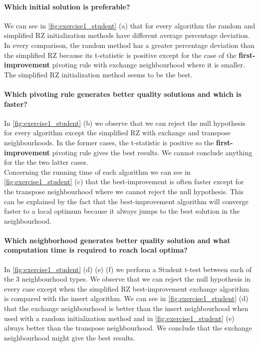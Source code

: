 \documentclass[a4paper,10pt]{article}
\begin{document}
\paragraph{Which initial solution is preferable?}

We can see in \ref{fig:exercise1_student} (a) that for every algorithm the random and simplified RZ initialization methods have different average percentage deviation. In every comparison, the random method has a greater percentage deviation than the simplified RZ because its t-statistic is positive except for the case of the \textbf{first-improvement} pivoting rule with exchange neighbourhood where it is smaller. The simplified RZ initialization method seems to be the best.

\paragraph{Which pivoting rule generates better quality solutions and which is faster?}

In \ref{fig:exercise1_student} (b) we observe that we can reject the null hypothesis for every algorithm except the simplified RZ with exchange and transpose neighbourhoods. In the former cases, the t-statistic is positive so the \textbf{first-improvement} pivoting rule gives the best results. We cannot conclude anything for the the two latter cases. \\

Concerning the running time of each algorithm we can see in \ref{fig:exercise1_student} (c) that the best-improvement is often faster except for the transpose neighbourhood where we cannot reject the null hypothesis. This can be explained by the fact that the best-improvement algorithm will converge faster to a local optimum because it always jumps to the best solution in the neighbourhood.

\paragraph{Which neighborhood generates better quality solution and what computation time is required to reach local optima?}

In \ref{fig:exercise1_student} (d) (e) (f) we perform a Student t-test between each of the 3 neighbourhood types. We observe that we can reject the null hypothesis in every case except when the simplified RZ best-improvement exchange algorithm is compared with the insert algorithm. We can see in \ref{fig:exercise1_student} (d) that the exchange neighbourhood is better than the insert neighbourhood when used with a random initialization method and in \ref{fig:exercise1_student} (e) always better than the transpose neighbourhood. We conclude that the exchange neighbourhood might give the best results.
\end{document}
